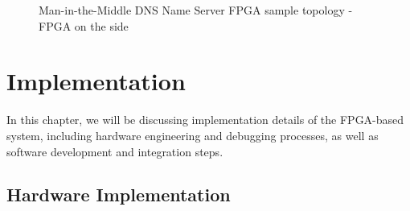 \documentclass[a4paper]{report}
\begin{document}
\begin{figure}[H]
  \caption{Man-in-the-Middle DNS Name Server FPGA sample topology - FPGA on the side}
  \label{fig:dns-flood-man-in-the-middle-asic}
\end{figure}

\chapter{Implementation}

In this chapter, we will be discussing implementation details of the FPGA-based system, including hardware engineering and debugging processes, as well as software development and integration steps.

\section{Hardware Implementation}
\label{section:implementation-hardware-implementation}
\end{document}
